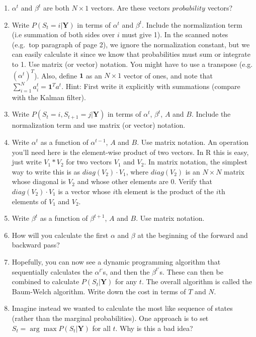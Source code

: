 \documentclass[]{article}
\begin{document}
\begin{enumerate}
\def\labelenumi{\arabic{enumi}.}
\setcounter{enumi}{1}
\item
  \(\alpha^t\) and \(\beta^t\) are both \(N \times 1\) vectors. Are
  these vectors \(probability\) vectors?
\item
  Write \(P(S_t = i | \mathbf{Y})\) in terms of \(\alpha^t\) and
  \(\beta^t\). Include the normalization term (i.e summation of both
  sides over \(i\) must give 1). In the scanned notes (e.g.~top
  paragraph of page 2), we ignore the normalization constant, but we can
  easily calculate it since we know that probabilities must sum or
  integrate to 1. Use matrix (or vector) notation. You might have to use
  a transpose (e.g. \((\alpha^t)^T\)). Also, define \(\mathbf{1}\) as an
  \(N \times 1\) vector of ones, and note that
  \(\sum_{i=1}^N a_i^t = \mathbf{1}^Ta^t\). Hint: First write it
  explicitly with summations (compare with the Kalman filter).
\item
  Write \(P(S_t = i, S_{t+1} = j|\mathbf{Y})\) in terms of \(\alpha^t\),
  \(\beta^t\), \(A\) and \(B\). Include the normalization term and use
  matrix (or vector) notation.
\item
  Write \(\alpha^t\) as a function of \(\alpha^{t-1}\), \(A\) and \(B\).
  Use matrix notation. An operation you'll need here is the element-wise
  product of two vectors. In R this is easy, just write \(V_1 \ast V_2\)
  for two vectors \(V_1\) and \(V_2\). In matrix notation, the simplest
  way to write this is as \(diag(V_2) \cdot V_1\), where \(diag(V_2)\)
  is an \(N \times N\) matrix whose diagonal is \(V_2\) and whose other
  elements are 0. Verify that \(diag(V_2) \cdot V_1\) is a vector whose
  \(i\)th element is the product of the \(i\)th elements of \(V_1\) and
  \(V_2\).
\item
  Write \(\beta^t\) as a function of \(\beta^{t+1}\), \(A\) and \(B\).
  Use matrix notation.
\item
  How will you calculate the first \(\alpha\) and \(\beta\) at the
  beginning of the forward and backward pass?
\item
  Hopefully, you can now see a dynamic programming algorithm that
  sequentially calculates the \(\alpha^{t\prime}\)s, and then the
  \(\beta^{t\prime}\)s. These can then be combined to calculate
  \(P(S_t|\mathbf{Y})\) for any \(t\). The overall algorithm is called
  the Baum-Welch algorithm. Write down the cost in terms of \(T\) and
  \(N\).
\item
  Imagine instead we wanted to calculate the most like sequence of
  states (rather than the marginal probabilities). One approach is to
  set \(S_t = \arg \max P(S_t|\mathbf{Y})\) for all \(t\). Why is this a
  bad idea?
\end{enumerate}
\end{document}
